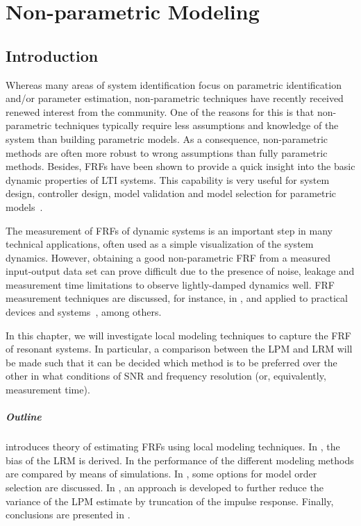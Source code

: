 \chapter{Non-parametric Modeling}
\def\thisDir{ch03-lrm}
\label{sec:nonparametric}

\section{Introduction}
\label{sec:nonparametric:introduction}

Whereas many areas of system identification focus on parametric identification and/or parameter estimation, non-parametric techniques have recently received renewed interest from the community.
One of the reasons for this is that non-parametric techniques typically require less assumptions and knowledge of the system than building parametric models.
As a consequence, non-parametric methods are often more robust to wrong assumptions than fully parametric methods.
Besides, \glspl{FRF} have been shown to provide a quick insight into the basic dynamic properties of \gls{LTI} systems.
This capability is very useful for system design, controller design, model validation and model selection for parametric models~\citep{Pintelon2012}.

The measurement of \glspl{FRF} of dynamic systems is an important step in many technical applications, often used as a simple visualization of the system dynamics.
However, obtaining a good non-parametric \gls{FRF} from a measured input-output data set can prove difficult due to the presence of noise, leakage and measurement time limitations to observe lightly-damped dynamics well.
\gls{FRF} measurement techniques are discussed, for instance, in
\citep{Schoukens1998,Schoukens2006LPM,Guillaume1996,Broersen1995,Pintelon2010LPM1,Antoni2007FRF,Pintelon2012}, and applied to practical devices and systems~\citep{Lim2010,Robinson1990,Behjat2010}, among others.

In this chapter, we will investigate local modeling techniques to capture the \gls{FRF} of resonant systems.
In particular, a comparison between the \gls{LPM} and \gls{LRM} will be made such that it can be decided which method is to be preferred over the other in what conditions of \gls{SNR} and frequency resolution (or, equivalently, measurement time).

\paragraph*{Outline}
 introduces theory of estimating \glspl{FRF} using local modeling techniques.
In , the bias of the \gls{LRM} is derived.
In  the performance of the different modeling methods are compared by means of simulations.
In , some options for model order selection are discussed.
In , an approach is developed to further reduce the variance of the \gls{LPM} estimate by truncation of the impulse response.
Finally, conclusions are presented in .

